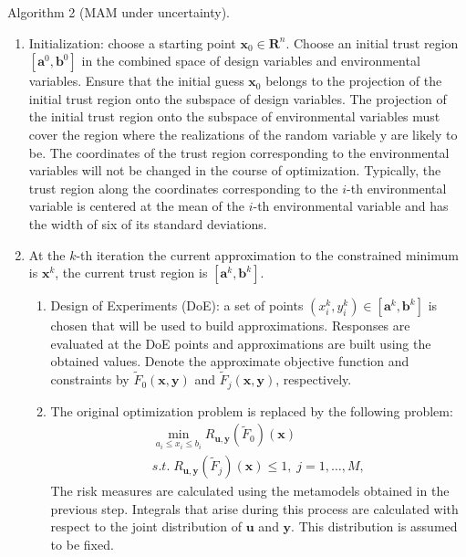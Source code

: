 \documentclass{llncs}
\begin{document}
Algorithm 2 (MAM under uncertainty).
\begin{enumerate}
  \item Initialization: choose a starting point $\pmb x_0 \in {\pmb R}^n$. 
	Choose an initial trust region $[\pmb a^0,\pmb b^0]$ in the combined space of design variables and environmental variables. 
	Ensure that the initial guess $\pmb x_0$ belongs to the projection of the initial trust region onto the subspace of design variables. The projection of the initial trust region onto the subspace of environmental variables must cover the region where the realizations of the random variable y are likely to be. The coordinates of the trust region corresponding to the environmental variables will not be changed in the course of optimization. Typically, the trust region along the coordinates corresponding to the $i$-th environmental variable is centered at the mean of the $i$-th environmental variable and has the width of six of its standard deviations.
  \item At the $k$-th iteration the current approximation to the constrained minimum is $\pmb x^k$, the current trust region is $[\pmb a^k,\pmb b^k]$.
  \begin{enumerate}[label=(\alph*)]
    \item Design of Experiments (DoE): a set of points $(x_i^k,y_i^k)\in [\pmb a^k,\pmb b^k]$ is chosen that will be used to build approximations. Responses are evaluated at the DoE points and approximations are built using the obtained values.
    Denote the approximate objective function and constraints by $\widetilde{F}_0(\pmb x, \pmb y)$ and $\widetilde{F}_j(\pmb x, \pmb y)$, respectively.
    \item The original optimization problem is replaced by the following problem:
    \begin{equation}
      \label{eq:problem_u_tilde}
      \begin{array}{c}
      \min\limits_{a_i \le x_i \le b_i}R_{\pmb u,\pmb y}(\widetilde{F}_0)(\pmb x) \\
      s.t.\; R_{\pmb u,\pmb y}(\widetilde{F}_j)(\pmb x) \le 1,\; j=1,\dots ,M,
      \end{array}
    \end{equation}
    The risk measures are calculated using the metamodels obtained in the previous step. Integrals that arise during this process are calculated with respect to the joint distribution of $\pmb u$ and $\pmb y$. This distribution is assumed to be fixed.

\end{enumerate}
\end{enumerate}
\end{document}
